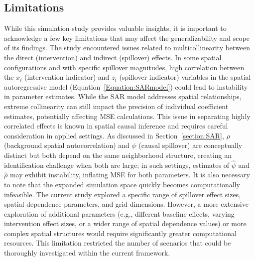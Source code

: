 \documentclass{article}[11pt]
\begin{document}
\subsection{Limitations}

While this simulation study provides valuable insights, it is important to acknowledge a few key limitations that may affect the generalizability and scope of its findings. The study encountered issues related to multicollinearity between the direct (intervention) and indirect (spillover) effects. In some spatial configurations and with specific spillover magnitudes, high correlation between the $x_i$ (intervention indicator) and $z_i$ (spillover indicator) variables in the spatial autoregressive model (Equation~\ref{Equation:SARmodel}) could lead to instability in parameter estimates. While the SAR model addresses spatial relationships, extreme collinearity can still impact the precision of individual coefficient estimates, potentially affecting MSE calculations. This issue in separating highly correlated effects is known in spatial causal inference and requires careful consideration in applied settings. As discussed in Section~\ref{section:SAR}, $\rho$ (background spatial autocorrelation) and $\psi$ (causal spillover) are conceptually distinct but both depend on the same neighborhood structure, creating an identification challenge when both are large; in such settings, estimates of $\hat{\psi}$ and $\hat{\rho}$ may exhibit instability, inflating MSE for both parameters. It is also necessary to note that the expanded simulation space quickly becomes computationally infeasible. The current study explored a specific range of spillover effect sizes, spatial dependence parameters, and grid dimensions. However, a more extensive exploration of additional parameters (e.g., different baseline effects, varying intervention effect sizes, or a wider range of spatial dependence values) or more complex spatial structures would require significantly greater computational resources. This limitation restricted the number of scenarios that could be thoroughly investigated within the current framework.
\end{document}
